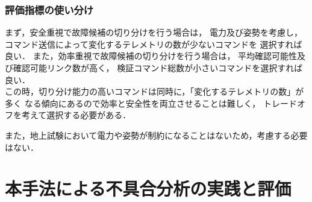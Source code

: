 \documentclass[11pt]{jsarticle}%
\begin{document}
\begin{multicols}{2}
\subsubsection{評価指標の使い分け}
まず，安全重視で故障候補の切り分けを行う場合は，
電力及び姿勢を考慮し，コマンド送信によって変化するテレメトリの数が少ないコマンドを
選択すれば良い．
また，効率重視で故障候補の切り分けを行う場合は，
平均確認可能性及び確認可能リンク数が高く，
検証コマンド総数が小さいコマンドを選択すれば良い．\\
この時，切り分け能力の高いコマンドは同時に，「変化するテレメトリの数」が多く
なる傾向にあるので効率と安全性を両立させることは難しく，
トレードオフを考えて選択する必要がある．　%

また，地上試験において電力や姿勢が制約になることはないため，考慮する必要はない．

\vspace{-1zh}
\section{本手法による不具合分析の実践と評価}
  \vspace{-1zh}

\end{multicols}
\end{document}
